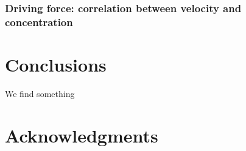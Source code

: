 \documentclass[twocolumn,aps,pre,amsmath,amssymb,floatfix,longbibliography]{revtex4-1}
\begin{document}
\subsubsection{Driving force: correlation between velocity and concentration}
\section{Conclusions}
We find something

\section*{Acknowledgments}


%

\end{document}
